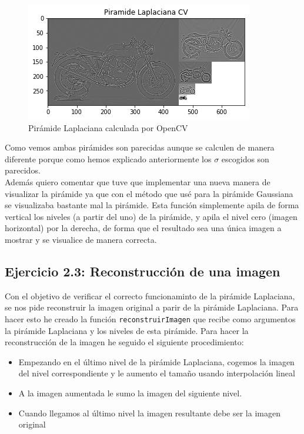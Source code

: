 \documentclass[12pt,spanish]{article}
\begin{document}
\begin{figure}[H]
	\includegraphics[width=\textwidth]{./imagenes_memoria/pir_laplaCV.png}
	\caption {Pirámide Laplaciana calculada por OpenCV}
	\label{pir_laplaCV}
\end{figure}

Como vemos ambas pirámides son parecidas aunque se calculen de manera diferente porque como hemos explicado anteriormente los $\sigma$ escogidos son parecidos.\\

Además quiero comentar que tuve que implementar una nueva manera de visualizar la pirámide ya que con el método que usé para la pirámide Gaussiana se visualizaba bastante mal la pirámide. Esta función simplemente apila de forma vertical los niveles (a partir del uno) de la pirámide, y apila el nivel cero (imagen horizontal) por la derecha, de forma que el resultado sea una única imagen a mostrar y se visualice de manera correcta.

\subsection{Ejercicio 2.3: Reconstrucción de una imagen}
Con el objetivo de verificar el correcto funcionaminto de la pirámide Laplaciana, se nos pide reconstruir la imagen original a parir de la pirámide Laplaciana. Para hacer esto he creado la función \texttt{reconstruirImagen} que recibe como argumentos la pirámide Laplaciana y los niveles de esta pirámide. Para hacer la reconstrucción de la imagen he seguido el siguiente procedimiento:
\begin{itemize}
	\item Empezando en el último nivel de la pirámide Laplaciana, cogemos la imagen del nivel correspondiente y le aumento el tamaño usando interpolación lineal
	\item A la imagen aumentada le sumo la imagen del siguiente nivel.
	\item Cuando llegamos al último nivel la imagen resultante debe ser la imagen original
\end{itemize}
\end{document}
